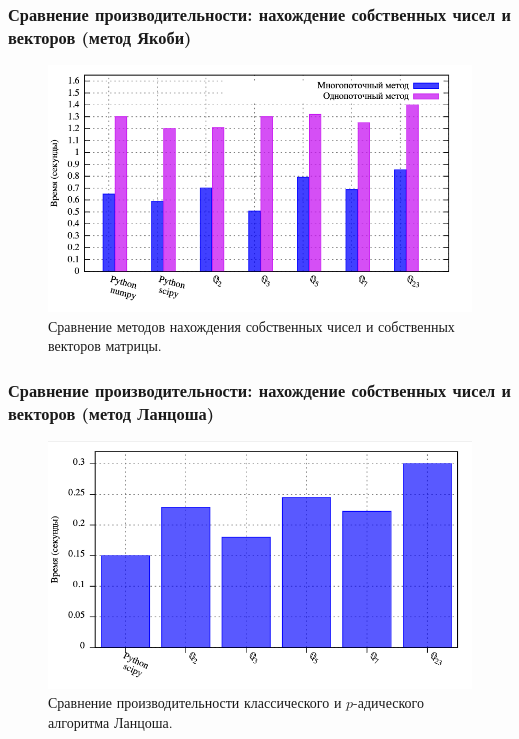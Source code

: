 \documentclass[10pt,professionalfont,utf8,presentation,compress]{beamer}
\theoremstyle{definition}
\theoremstyle{plain}
\begin{document}
\begin{frame}
\frametitle{Сравнение производительности: нахождение собственных чисел и векторов (метод Якоби)}
\begin{figure}[H]
\centerline{\includegraphics[width=0.95\linewidth]{../gnuplot/multi/jacoby/plot.png}}
\caption{Сравнение методов нахождения собственных чисел и собственных векторов матрицы.}
\label{img:multi:jacoby}
\end{figure}
\end{frame}


\begin{frame}
\frametitle{Сравнение производительности: нахождение собственных чисел и векторов (метод Ланцоша)}
\begin{figure}[H]
\centerline{\includegraphics[width=0.95\linewidth]{../gnuplot/multi/lanczos/plot.png}}
\caption{Сравнение производительности классического и $p$-адического алгоритма Ланцоша.}
\label{img:multi:lanczos}
\end{figure}
\end{frame}
\end{document}
